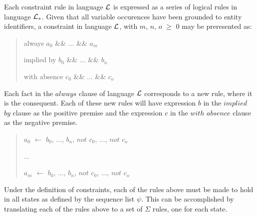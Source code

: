 \documentclass[10pt, twocolumn]{article}
\begin{document}
          Each constraint rule in language ${\cal L}$ is expressed as a series
          of logical rules in language ${\cal L}_{*}$. Given that all variable
          occurences have been grounded to entity identifiers, a constraint in
          language ${\cal L}$, with $m$, $n$, $o$ $\geq$ $0$ may be preresented
          as:

          \begin{quote}
            always $a_{0}$ \&\& ... \&\& $a_{m}$

            implied by $b_{0}$ \&\& ... \&\& $b_{n}$

            with absence $c_{0}$ \&\& ... \&\& $c_{o}$
          \end{quote}
         
          Each fact in the $always$ clause of language ${\cal L}$ corresponds
          to a new rule, where it is the consequent. Each of these new rules
          will have expression $b$ in the $implied$ $by$ clause as the positive
          premise and the expression $c$ in the $with$ $absence$ clause as the
          negative premise.

          \begin{quote}
            $a_{0}$ $\leftarrow$
            $b_{0}$, ..., $b_{n}$,
            $not$ $c_{0}$, ..., $not$ $c_{o}$

            ...

            $a_{m}$ $\leftarrow$
            $b_{0}$, ..., $b_{n}$,
            $not$ $c_{0}$, ..., $not$ $c_{o}$
          \end{quote}

          Under the definition of constraints, each of the rules above must be
          made to hold in all states as defined by the sequence list $\psi$.
          This can be accomplished by translating each of the rules above to
          a set of $\Sigma$ rules, one for each state.
\end{document}
